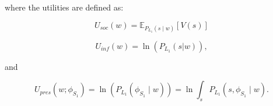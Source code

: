 \documentclass[9pt,twocolumn,twoside,lineno]{main_class_file}
\begin{document}
{where the utilities are defined as:

\begin{equation}
U_{soc}(w) = \mathbb{E}_{P_{L_1}(s \mid w)}[V(s)]
\end{equation}

\begin{equation}
U_{inf}(w) = \ln(P_{L_1}(s | w)), 
\end{equation}

and

\begin{equation}
U_{pres}(w; \phi_{S_1}) = \ln(P_{L_1}(\phi_{S_1} \mid w)) = \ln \int_s P_{L_1}(s, \phi_{S_1} \mid w).
\end{equation}


%
%
%
}
\end{document}
